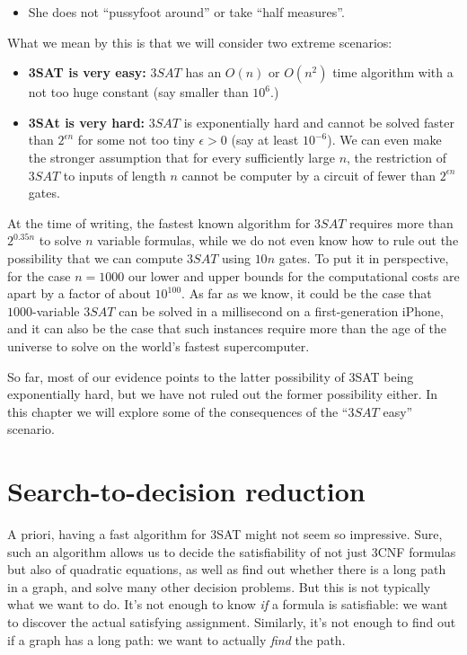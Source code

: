 \begin{itemize}
\tightlist
\item
  She does not ``pussyfoot around'' or take ``half measures''.
\end{itemize}

What we mean by this is that we will consider two extreme scenarios:

\begin{itemize}
\item
  \textbf{3SAT is very easy:} \(3\ensuremath{\mathit{SAT}}\) has an
  \(O(n)\) or \(O(n^2)\) time algorithm with a not too huge constant
  (say smaller than \(10^6\).)
\item
  \textbf{3SAt is very hard:} \(3\ensuremath{\mathit{SAT}}\) is
  exponentially hard and cannot be solved faster than \(2^{\epsilon n}\)
  for some not too tiny \(\epsilon>0\) (say at least \(10^{-6}\)). We
  can even make the stronger assumption that for every sufficiently
  large \(n\), the restriction of \(3\ensuremath{\mathit{SAT}}\) to
  inputs of length \(n\) cannot be computer by a circuit of fewer than
  \(2^{\epsilon n}\) gates.
\end{itemize}

At the time of writing, the fastest known algorithm for
\(3\ensuremath{\mathit{SAT}}\) requires more than \(2^{0.35 n}\) to
solve \(n\) variable formulas, while we do not even know how to rule out
the possibility that we can compute \(3\ensuremath{\mathit{SAT}}\) using
\(10n\) gates. To put it in perspective, for the case \(n=1000\) our
lower and upper bounds for the computational costs are apart by a factor
of about \(10^{100}\). As far as we know, it could be the case that
\(1000\)-variable \(3\ensuremath{\mathit{SAT}}\) can be solved in a
millisecond on a first-generation iPhone, and it can also be the case
that such instances require more than the age of the universe to solve
on the world's fastest supercomputer.

So far, most of our evidence points to the latter possibility of 3SAT
being exponentially hard, but we have not ruled out the former
possibility either. In this chapter we will explore some of the
consequences of the ``\(3\ensuremath{\mathit{SAT}}\) easy'' scenario.

\section{Search-to-decision reduction}\label{Search-to-decision-reduct}

A priori, having a fast algorithm for 3SAT might not seem so impressive.
Sure, such an algorithm allows us to decide the satisfiability of not
just 3CNF formulas but also of quadratic equations, as well as find out
whether there is a long path in a graph, and solve many other decision
problems. But this is not typically what we want to do. It's not enough
to know \emph{if} a formula is satisfiable: we want to discover the
actual satisfying assignment. Similarly, it's not enough to find out if
a graph has a long path: we want to actually \emph{find} the path.

